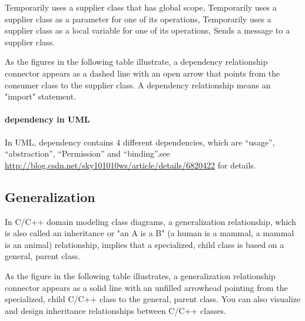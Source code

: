 \documentclass{book}
\begin{document}
    Temporarily uses a supplier class that has global scope,
    Temporarily uses a supplier class as a parameter for one of its operations,
    Temporarily uses a supplier class as a local variable for one of its operations,
    Sends a message to a supplier class.

As the figures in the following table illustrate, a dependency relationship connector appears as a dashed line with an open arrow that points from the consumer class to the supplier class.
A dependency relationship means an "import" statement.

\begin{figure}[h]
\begin{floatrow}
\end{floatrow}
\end{figure}

\paragraph{dependency in UML}
In UML, dependency contains 4 different dependencies, which are ``usage'', ``abstraction'', ``Permission'' and ``binding''.see \url{http://blog.csdn.net/sky101010ws/article/details/6820422}
for details.

\subsection{Generalization}
In C/C++ domain modeling class diagrams, a generalization relationship, which is also called an inheritance or "an A is a B" (a human is a mammal, a mammal is an animal) relationship,
implies that a specialized, child class is based on a general, parent class.

As the figure in the following table illustrates, a generalization relationship connector appears as a solid line with an unfilled arrowhead pointing from the specialized,
child C/C++ class to the general, parent class. You can also visualize and design inheritance relationships between C/C++ classes.

\begin{figure}[h]
\begin{floatrow}
\end{floatrow}
\end{figure}
\end{document}
